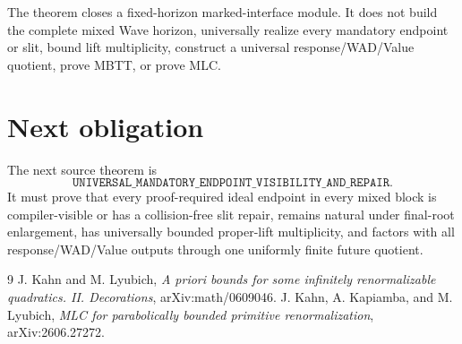\documentclass[11pt]{article}
\theoremstyle{definition}
\theoremstyle{remark}
\begin{document}
The theorem closes a fixed-horizon marked-interface module.  It does not build
the complete mixed Wave horizon, universally realize every mandatory endpoint
or slit, bound lift multiplicity, construct a universal response/WAD/Value
quotient, prove MBTT, or prove MLC.

\section{Next obligation}
The next source theorem is
\[
 \boxed{\texttt{UNIVERSAL\_MANDATORY\_ENDPOINT\_VISIBILITY\_AND\_REPAIR}.}
\]
It must prove that every proof-required ideal endpoint in every mixed block is
compiler-visible or has a collision-free slit repair, remains natural under
final-root enlargement, has universally bounded proper-lift multiplicity, and
factors with all response/WAD/Value outputs through one uniformly finite future
quotient.

\begin{thebibliography}{9}
J. Kahn and M. Lyubich,
\emph{A priori bounds for some infinitely renormalizable quadratics. II.
Decorations}, arXiv:math/0609046.
J. Kahn, A. Kapiamba, and M. Lyubich,
\emph{MLC for parabolically bounded primitive renormalization},
arXiv:2606.27272.
\end{thebibliography}
\end{document}
